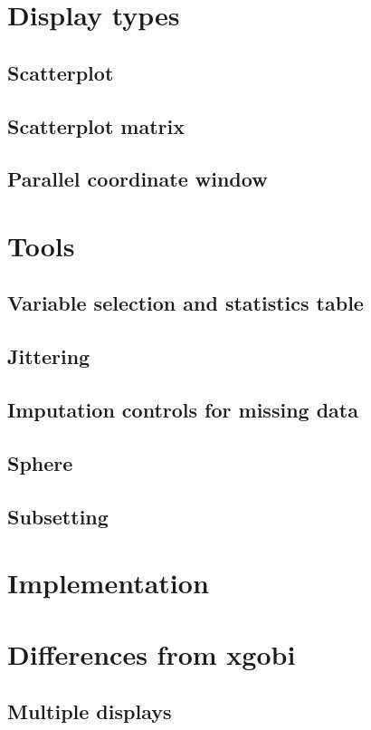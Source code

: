 \documentclass[11pt]{article}
\begin{document}
\section {Display types}
\subsection{Scatterplot}
\subsection{Scatterplot matrix}
\subsection{Parallel coordinate window}

\newpage
\section{Tools}
\subsection{Variable selection and statistics table}
\label{slbl:VarStats}
\subsection{Jittering}
\subsection{Imputation controls for missing data}
\subsection{Sphere}
\label{slbl:Sphere}
\subsection{Subsetting}

\section{Implementation}

\section{Differences from xgobi}
\label{slbl:xgobi}

\subsection {Multiple displays}
\end{document}
